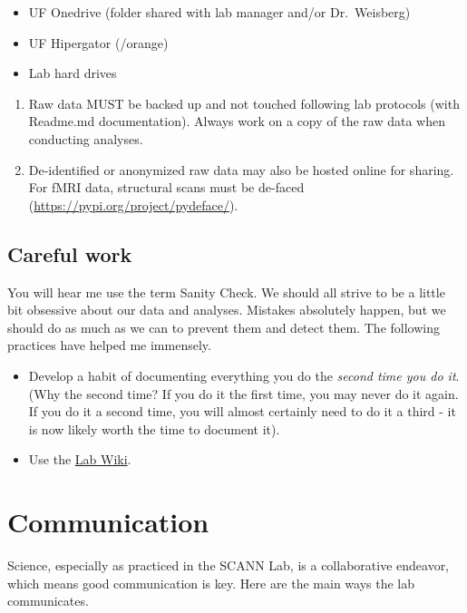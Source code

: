 \documentclass[
  12pt,
]{book}
\providecommand{\tightlist}{%
  \setlength{\itemsep}{0pt}\setlength{\parskip}{0pt}}
\begin{document}
\begin{itemize}
\tightlist
\item
  UF Onedrive (folder shared with lab manager and/or Dr.~Weisberg)
\item
  UF Hipergator (/orange)
\item
  Lab hard drives
\end{itemize}

\begin{enumerate}
\def\labelenumi{\arabic{enumi}.}
\setcounter{enumi}{1}
\item
  Raw data MUST be backed up and not touched following lab protocols (with Readme.md documentation). Always work on a copy of the raw data when conducting analyses.
\item
  De-identified or anonymized raw data may also be hosted online for sharing. For fMRI data, structural scans must be de-faced (\url{https://pypi.org/project/pydeface/}).
\end{enumerate}

\hypertarget{careful-work}{%
\section{Careful work}\label{careful-work}}

You will hear me use the term Sanity Check. We should all strive to be a little bit obsessive about our data and analyses. Mistakes absolutely happen, but we should do as much as we can to prevent them and detect them. The following practices have helped me immensely.

\begin{itemize}
\item
  Develop a habit of documenting everything you do the \emph{second time you do it}. (Why the second time? If you do it the first time, you may never do it again. If you do it a second time, you will almost certainly need to do it a third - it is now likely worth the time to document it).
\item
  Use the \href{https://osf.io/d8ke4/}{Lab Wiki}.
\end{itemize}

\hypertarget{communication}{%
\chapter{Communication}\label{communication}}

Science, especially as practiced in the SCANN Lab, is a collaborative endeavor, which means good communication is key. Here are the main ways the lab communicates.
\end{document}
